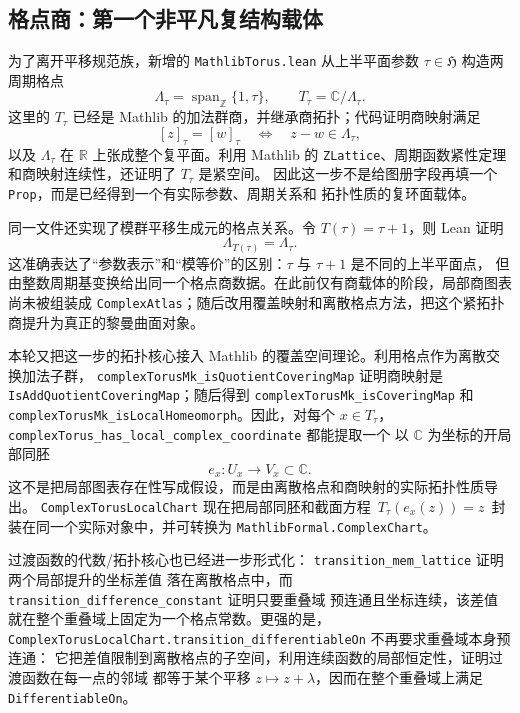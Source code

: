 \documentclass[UTF8,fontset=none,a4paper,11pt]{ctexart}
\begin{document}
\clearpage
\subsection{格点商：第一个非平凡复结构载体}

为了离开平移规范族，新增的 \texttt{MathlibTorus.lean} 从上半平面参数
$\tau\in\mathfrak H$ 构造两周期格点
\[
  \Lambda_\tau
  =
  \operatorname{span}_{\mathbb Z}\{1,\tau\},
  \qquad
  T_\tau=\mathbb C/\Lambda_\tau.
\]
这里的 $T_\tau$ 已经是 Mathlib 的加法群商，并继承商拓扑；代码证明商映射满足
\[
  [z]_\tau=[w]_\tau
  \quad\Longleftrightarrow\quad
  z-w\in\Lambda_\tau,
\]
以及 $\Lambda_\tau$ 在 $\mathbb R$ 上张成整个复平面。利用 Mathlib 的
\texttt{ZLattice}、周期函数紧性定理和商映射连续性，还证明了 $T_\tau$ 是紧空间。
因此这一步不是给图册字段再填一个 \texttt{Prop}，而是已经得到一个有实际参数、周期关系和
拓扑性质的复环面载体。

同一文件还实现了模群平移生成元的格点关系。令
$T(\tau)=\tau+1$，则 Lean 证明
\[
  \Lambda_{T(\tau)}=\Lambda_\tau.
\]
这准确表达了“参数表示”和“模等价”的区别：$\tau$ 与 $\tau+1$ 是不同的上半平面点，
但由整数周期基变换给出同一个格点商数据。在此前仅有商载体的阶段，局部商图表尚未被组装成
\texttt{ComplexAtlas}；随后改用覆盖映射和离散格点方法，把这个紧拓扑商提升为真正的黎曼曲面对象。

本轮又把这一步的拓扑核心接入 Mathlib 的覆盖空间理论。利用格点作为离散交换加法子群，
\texttt{complexTorusMk\_isQuotientCoveringMap} 证明商映射是
\texttt{IsAddQuotientCoveringMap}；随后得到
\texttt{complexTorusMk\_isCoveringMap} 和
\texttt{complexTorusMk\_isLocalHomeomorph}。因此，对每个
$x\in T_\tau$，\texttt{complexTorus\_has\_local\_complex\_coordinate} 都能提取一个
以 $\mathbb C$ 为坐标的开局部同胚
\[
  e_x:U_x\longrightarrow V_x\subset\mathbb C.
\]
这不是把局部图表存在性写成假设，而是由离散格点和商映射的实际拓扑性质导出。
\texttt{ComplexTorusLocalChart} 现在把局部同胚和截面方程
\(\,T_\tau(e_x(z))=z\,\) 封装在同一个实际对象中，并可转换为
\texttt{MathlibFormal.ComplexChart}。

过渡函数的代数/拓扑核心也已经进一步形式化：
\texttt{transition\_mem\_lattice} 证明两个局部提升的坐标差值
落在离散格点中，而 \texttt{transition\_difference\_constant} 证明只要重叠域
预连通且坐标连续，该差值就在整个重叠域上固定为一个格点常数。更强的是，
\texttt{ComplexTorusLocalChart.transition\_differentiableOn} 不再要求重叠域本身预连通：
它把差值限制到离散格点的子空间，利用连续函数的局部恒定性，证明过渡函数在每一点的邻域
都等于某个平移 \(z\mapsto z+\lambda\)，因而在整个重叠域上满足
\texttt{DifferentiableOn}。
\end{document}

